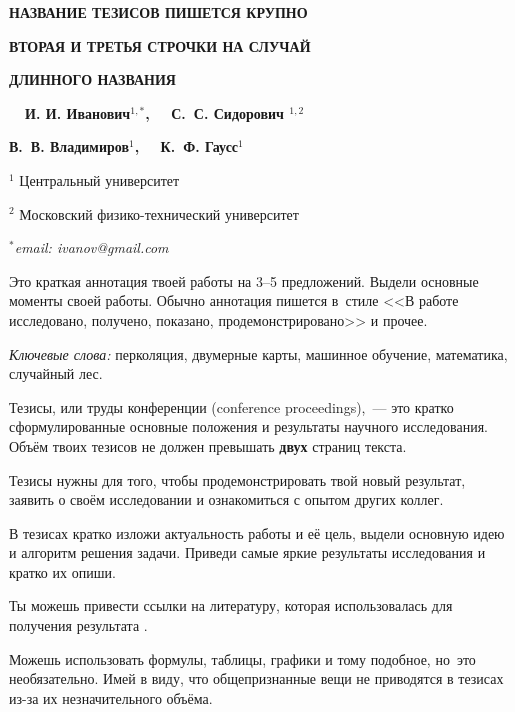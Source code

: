 \documentclass[oneside, a5paper,10pt]{article}
\begin{document}
\pagestyle{fancy}
\fancyhead{}\fancyfoot{}
\cfoot{\thepage}

\centerline{\bf НАЗВАНИЕ ТЕЗИСОВ ПИШЕТСЯ КРУПНО} %
\centerline{\bf ВТОРАЯ И ТРЕТЬЯ СТРОЧКИ НА СЛУЧАЙ } %
\centerline{\bf ДЛИННОГО НАЗВАНИЯ}

\smallskip %
\centerline{\bf}
\centerline{\bf \ \ И. И. Иванович$^{1,*}$,   \ \ С.~С. Сидорович $^{1,2}$}
\centerline{\bf В.~В. Владимиров$^{1}$, \ \ К.~Ф. Гаусс$^{1}$}
\smallskip
\centerline{$^{1}$ Центральный университет}
\centerline{$^{2}$ Московский физико-технический университет}
\centerline{$^{*}$\it email: ivanov@gmail.com}
\bigskip %

Это краткая аннотация твоей работы на 3--5 предложений. Выдели основные моменты своей работы. Обычно аннотация пишется в~стиле <<В работе исследовано, получено, показано, продемонстрировано>> и прочее. 
\medskip

\textit{Ключевые слова:} перколяция, двумерные карты, машинное обучение, математика, случайный лес. %

\medskip %

Тезисы, или труды конференции (conference proceedings),~--- это кратко сформулированные основные положения и результаты научного исследования. Объём твоих тезисов не должен превышать \textbf{двух} страниц текста. 

Тезисы нужны для того, чтобы продемонстрировать твой новый результат, заявить о своём исследовании и ознакомиться с опытом других коллег.

В тезисах кратко изложи актуальность работы и её цель, выдели основную идею и алгоритм решения задачи. Приведи самые яркие результаты исследования и кратко их опиши. 

Ты можешь привести ссылки на литературу, которая использовалась для получения результата \cite{Ivanov24, Sidorob20, Pavlov 01}.
 
Можешь использовать формулы, таблицы, графики и тому подобное, но~это необязательно. Имей в виду, что общепризнанные вещи не приводятся в тезисах из-за их незначительного объёма.
\end{document}
